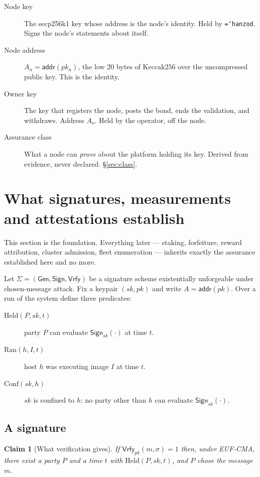 \documentclass[11pt,a4paper]{article}
\newtheorem{claim}[definition]{Claim}
\newcommand{\code}[1]{\texttt{\hyphenchar\font=`\-\relax #1}}
\newcommand{\Held}{\mathrm{Held}}
\newcommand{\Ran}{\mathrm{Ran}}
\newcommand{\Conf}{\mathrm{Conf}}
\newcommand{\Vrfy}{\mathsf{Vrfy}}
\newcommand{\Sign}{\mathsf{Sign}}
\newcommand{\addr}{\mathsf{addr}}
\newcommand{\kec}{\mathrm{Keccak256}}
\begin{document}
\begin{description}
\item[Node key] The secp256k1 key whose address is the node's identity. Held by
  \code{hanzod}. Signs the node's statements about itself.

\item[Node address] $A_n = \addr(pk_n)$, the low 20 bytes of $\kec$ over the
  uncompressed public key. This is the identity.

\item[Owner key] The key that registers the node, posts the bond, ends the
  validation, and withdraws. Address $A_o$. Held by the operator, off the node.

\item[Assurance class] What a node can \emph{prove} about the platform holding
  its key. Derived from evidence, never declared. \S\ref{sec:class}.
\end{description}

\section{What signatures, measurements and attestations establish}
\label{sec:proves}

This section is the foundation. Everything later --- staking, forfeiture, reward
attribution, cluster admission, fleet enumeration --- inherits exactly the
assurance established here and no more.

Let $\Sigma = (\mathsf{Gen}, \Sign, \Vrfy)$ be a signature scheme existentially
unforgeable under chosen-message attack. Fix a keypair $(sk, pk)$ and write
$A = \addr(pk)$. Over a run of the system define three predicates:

\begin{description}
\item[$\Held(P, sk, t)$] party $P$ can evaluate $\Sign_{sk}(\cdot)$ at time $t$.
\item[$\Ran(h, I, t)$] host $h$ was executing image $I$ at time $t$.
\item[$\Conf(sk, h)$] $sk$ is confined to $h$: no party other than $h$ can
  evaluate $\Sign_{sk}(\cdot)$.
\end{description}

\subsection{A signature}

\begin{claim}[What verification gives]\label{cl:sig}
If $\Vrfy_{pk}(m, \sigma) = 1$ then, under EUF-CMA, there exist a party $P$ and a
time $t$ with $\Held(P, sk, t)$, and $P$ chose the message $m$.
\end{claim}
\end{document}
